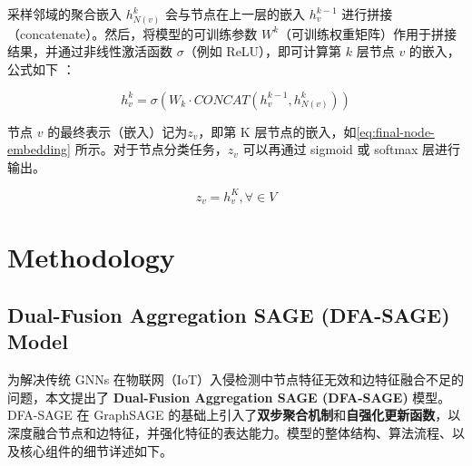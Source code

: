 \documentclass{article}
\begin{document}
采样邻域的聚合嵌入 $h_{N(v)}^k$ 会与节点在上一层的嵌入 $h_v^{k-1}$ 进行拼接（concatenate）。然后，将模型的可训练参数 $W^k$（可训练权重矩阵）作用于拼接结果，并通过非线性激活函数 $\sigma$（例如 ReLU），即可计算第 $k$ 层节点 $v$ 的嵌入，公式如下 \cite{hamilton2018inductiverepresentationlearninglarge}：

\begin{equation}
 h_v^k=\sigma ( W_k \cdot CONCAT (h_v^{k-1},h_{N(v)}^k) )
\end{equation}

节点 $v$ 的最终表示（嵌入）记为$z_v$，即第 K 层节点的嵌入，如\eqref{eq:final-node-embedding} 所示。对于节点分类任务，$z_v$ 可以再通过 sigmoid 或 softmax 层进行输出。

\begin{equation}
 z_v=h_v^K, \forall \in V
 \label{eq:final-node-embedding}
\end{equation}
\section{Methodology}

\subsection{Dual-Fusion Aggregation SAGE (DFA-SAGE) Model}

为解决传统 GNNs 在物联网（IoT）入侵检测中节点特征无效和边特征融合不足的问题，本文提出了 \textbf{Dual-Fusion Aggregation SAGE (DFA-SAGE)} 模型。DFA-SAGE 在 GraphSAGE 的基础上引入了\textbf{双步聚合机制}和\textbf{自强化更新函数}，以深度融合节点和边特征，并强化特征的表达能力。模型的整体结构、算法流程、以及核心组件的细节详述如下。
\end{document}
